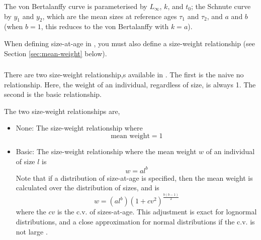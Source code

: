 The von Bertalanffy curve is parameterised by $L_\infty$, $k$, and $t_0$; the Schnute curve \citep{836} by $y_1$ and $y_2$, which are the mean sizes at reference ages $\tau_1$ and $\tau_2$, and $a$ and $b$ (when $b=1$, this reduces to the von Bertalanffy with $k=a$). 

When defining size-at-age in \iSAM, you must also define a size-weight relationship (see Section \ref{sec:mean-weight} below).

\subsubsection*{}

\subsubsection*{}

\subsubsection*{\label{sec:mean-weight}}

There are two size-weight relationship,s available in \iSAM. The first is the naive no relationship. Here, the weight of an individual, regardless of size, is always 1. The second is the basic relationship. 

The two size-weight relationships are,

\begin{itemize}
  \item{None:} The size-weight relationship where  
  \begin{equation}
    \text{mean weight}=1
  \end{equation}
  \item{Basic:} The size-weight relationship where the mean weight $w$ of an individual of size $l$ is
  \begin{equation}
    w=a l^b
  \end{equation}
	Note that if a distribution of size-at-age is specified, then the mean weight is calculated over the distribution of sizes, and is
  \begin{equation}
	  w=(al^b)(1+cv^2)^{\frac{b(b-1)}{2}}
  \end{equation}
	where the $cv$ is the c.v. of sizes-at-age. This adjustment is exact for lognormal distributions, and a close approximation for normal distributions if the c.v. is not large \citep{1388}.
\end{itemize}

